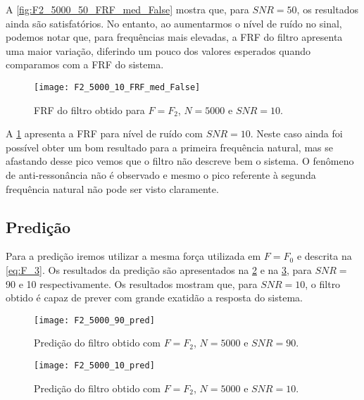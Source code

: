 A \cref{fig:F2_5000_50_FRF_med_False} mostra que, para $ SNR=50 $, os resultados ainda são satisfatórios. No entanto, ao aumentarmos o nível de ruído no sinal, podemos notar que, para frequências mais elevadas, a FRF do filtro apresenta uma maior variação, diferindo um pouco dos valores esperados quando comparamos com a FRF do sistema.

\begin{figure}
	\centering
	\texttt{[image: F2\_5000\_10\_FRF\_med\_False]}
	\caption{FRF do filtro obtido para $ F=F_2 $, $ N=5000 $ e $ SNR=10 $.}
	\label{fig:F2_5000_10_FRF_med_False}
\end{figure}

A \cref{fig:F2_5000_10_FRF_med_False} apresenta a FRF para nível de ruído com $ SNR=10 $. Neste caso ainda foi possível obter um bom resultado para a primeira frequência natural, mas se afastando desse pico vemos que o filtro não descreve bem o sistema. O fenômeno de anti-ressonância não é observado e mesmo o pico referente à segunda frequência natural não pode ser visto claramente.

\subsection{Predição}

Para a predição iremos utilizar a mesma força utilizada em $ F=F_0 $ e descrita na \cref{eq:F_3}. Os resultados da predição são apresentados na \cref{fig:F2_5000_90_pred} e na \cref{fig:F2_5000_10_pred}, para $ SNR= $ 90 e 10 respectivamente. Os resultados mostram que, para $ SNR=10 $, o filtro obtido é capaz de prever com grande exatidão a resposta do sistema.

\begin{figure}[h]
	\centering
	\texttt{[image: F2\_5000\_90\_pred]}
	\caption{Predição do filtro obtido com $ F=F_2 $, $ N=5000 $ e $ SNR=90 $.}
	\label{fig:F2_5000_90_pred}
\end{figure}  

\begin{figure}[h]
	\centering
	\texttt{[image: F2\_5000\_10\_pred]}
	\caption{Predição do filtro obtido com $ F=F_2 $, $ N=5000 $ e $ SNR=10 $.}
	\label{fig:F2_5000_10_pred}
\end{figure}
